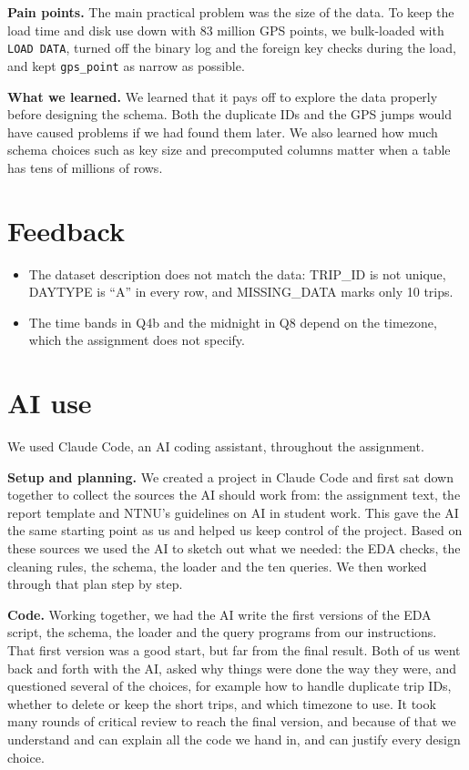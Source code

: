\documentclass[12pt,a4paper]{article}
\begin{document}
\textbf{Pain points.} The main practical problem was the size of the data.
To keep the load time and disk use down with 83 million GPS points, we
bulk-loaded with \texttt{LOAD DATA}, turned off the binary log and the
foreign key checks during the load, and kept \texttt{gps\_point} as narrow
as possible.

\textbf{What we learned.} We learned that it pays off to explore the data
properly before designing the schema. Both the duplicate IDs and the GPS
jumps would have caused problems if we had found them later. We also learned
how much schema choices such as key size and precomputed columns matter
when a table has tens of millions of rows.

\section*{Feedback}

\begin{itemize}
  \item The dataset description does not match the data: TRIP\_ID is not
        unique, DAYTYPE is ``A'' in every row, and MISSING\_DATA marks only
        10 trips.
  \item The time bands in Q4b and the midnight in Q8 depend on the
        timezone, which the assignment does not specify.
\end{itemize}

\section*{AI use}

We used Claude Code, an AI coding assistant, throughout the assignment.

\textbf{Setup and planning.} We created a project in Claude Code and first
sat down together to collect the sources the AI should work from: the
assignment text, the report template and NTNU's guidelines on AI in student
work. This gave the AI the same starting point as us and helped us keep
control of the project. Based on these sources we used the AI to sketch out
what we needed: the EDA checks, the cleaning rules, the schema, the loader and
the ten queries. We then worked through that plan step by step.

\textbf{Code.} Working together, we had the AI write the first versions of
the EDA script, the schema, the loader and the query programs from our
instructions. That first version
was a good start, but far from the final result. Both of us went back and
forth with the AI, asked why things were done the way they were, and
questioned several of the choices, for example how to handle duplicate trip
IDs, whether to delete or keep the short trips, and which timezone to use.
It took many rounds of critical review to reach the final version, and
because of that we understand and can explain all the code we hand in, and
can justify every design choice.
\end{document}
